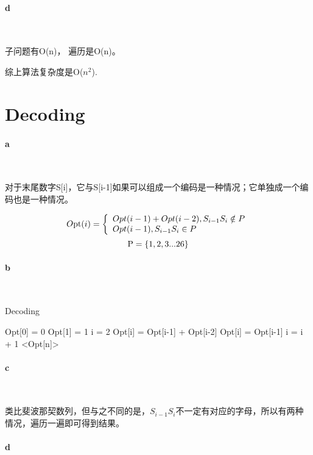 \documentclass{article}
\begin{document}
		\paragraph{d}\
		
		子问题有O(n)， 遍历是O(n)。
		
		综上算法复杂度是O(${n^2}$).
		
	\newpage
	\section{Decoding}
		\paragraph{a}\
		
		对于末尾数字S[i]，它与S[i-1]如果可以组成一个编码是一种情况；它单独成一个编码也是一种情况。
		
		\[O{\rm{pt}}(i) = \left\{ {\begin{array}{*{20}{l}}
			{Opt(i - 1) + Opt(i - 2) , {S_{i - 1}}{S_i} \notin P}\\
			{Opt(i - 1) , {S_{i - 1}}{S_i} \in P}
			\end{array}} \right.\]
		\[{\rm{P = \{ }}1,2,3...26{\rm{\} }}\]
		
		
		\paragraph{b}\
		\begin{algorithm}
			\caption{Decoding}
			\begin{algorithmic}
				\State Opt[0] = 0
				\State Opt[1] = 1
				\State i = 2
				\State Opt[i] = Opt[i-1] + Opt[i-2]
				\Else
				\State Opt[i] = Opt[i-1]
				\EndIf
				\State i = i + 1
				\EndFor
				\State
				\Return <Opt[n]>
				\EndProcedure
			\end{algorithmic}
		\end{algorithm}
	
		\paragraph{c}\
		
			类比斐波那契数列，但与之不同的是，${S_{i - 1}}{S_i}$不一定有对应的字母，所以有两种情况，遍历一遍即可得到结果。
		\paragraph{d}\
		
\end{document}
